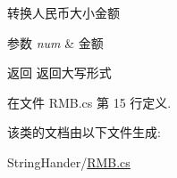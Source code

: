 转换人民币大小金额 


\begin{DoxyParams}{参数}
{\em num} & 金额\\
\hline
\end{DoxyParams}
\begin{DoxyReturn}{返回}
返回大写形式
\end{DoxyReturn}


在文件 R\-M\-B.\-cs 第 15 行定义.



该类的文档由以下文件生成\-:\begin{DoxyCompactItemize}
\item 
String\-Hander/\hyperlink{_r_m_b_8cs}{R\-M\-B.\-cs}\end{DoxyCompactItemize}
